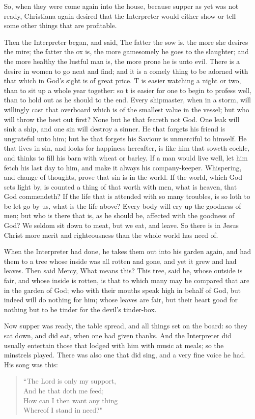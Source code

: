 So, when they were come again into the house, because supper as yet was not ready, Christiana again desired that the Interpreter would either show or tell some other things that are profitable.

Then the Interpreter began, and said, The fatter the sow is, the more she desires the mire; the fatter the ox is, the more gamesomely he goes to the slaughter; and the more healthy the lustful man is, the more prone he is unto evil. There is a desire in women to go neat and find; and it is a comely thing to be adorned with that which in God's sight is of great price. T is easier watching a night or two, than to sit up a whole year together: so t is easier for one to begin to profess well, than to hold out as he should to the end. Every shipmaster, when in a storm, will willingly cast that overboard which is of the smallest value in the vessel; but who will throw the best out first? None but he that feareth not God. One leak will sink a ship, and one sin will destroy a sinner. He that forgets his friend is ungrateful unto him; but he that forgets his Saviour is unmerciful to himself. He that lives in sin, and looks for happiness hereafter, is like him that soweth cockle, and thinks to fill his barn with wheat or barley. If a man would live well, let him fetch his last day to him, and make it always his company-keeper. Whispering, and change of thoughts, prove that sin is in the world. If the world, which God sets light by, is counted a thing of that worth with men, what is heaven, that God commendeth? If the life that is attended with so many troubles, is so loth to be let go by us, what is the life above? Every body will cry up the goodness of men; but who is there that is, as he should be, affected with the goodness of God? We seldom sit down to meat, but we eat, and leave. So there is in Jesus Christ more merit and righteousness than the whole world has need of.

When the Interpreter had done, he takes them out into his garden again, and had them to a tree whose inside was all rotten and gone, and yet it grew and had leaves. Then said Mercy, What means this? This tree, said he, whose outside is fair, and whose inside is rotten, is that to which many may be compared that are in the garden of God; who with their mouths speak high in behalf of God, but indeed will do nothing for him; whose leaves are fair, but their heart good for nothing but to be tinder for the devil's tinder-box.

Now supper was ready, the table spread, and all things set on the board: so they sat down, and did eat, when one had given thanks. And the Interpreter did usually entertain those that lodged with him with music at meals; so the minstrels played. There was also one that did sing, and a very fine voice he had. His song was this:
\begin{verse}
``The Lord is only my support,\\
And he that doth me feed;\\
How can I then want any thing\\
Whereof I stand in need?"\\
\end{verse}

